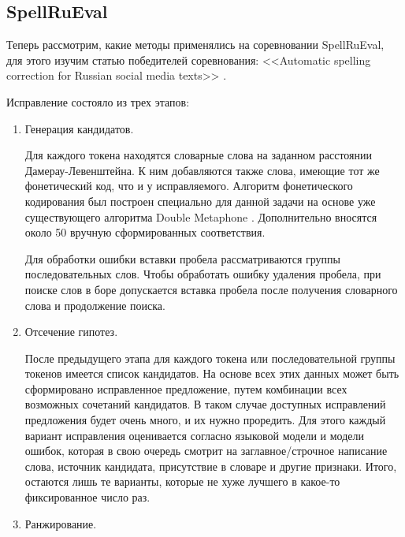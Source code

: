 \subsection{SpellRuEval}

Теперь рассмотрим, какие методы применялись на соревновании SpellRuEval, для этого изучим статью победителей соревнования: <<Automatic spelling correction for Russian social media texts>> \cite{Sorokin2016}.

Исправление состояло из трех этапов:
\begin{enumerate}
	\item Генерация кандидатов.
	
	Для каждого токена находятся словарные слова на заданном расстоянии Дамерау-Левенштейна. К ним добавляются также слова, имеющие тот же фонетический код, что и у исправляемого. Алгоритм фонетического кодирования был построен специально для данной задачи на основе уже существующего алгоритма Double Metaphone \cite{Philips2000}.  Дополнительно вносятся около 50 вручную сформированных соответствия. 
	
	Для обработки ошибки вставки пробела рассматриваются группы последовательных слов. Чтобы обработать ошибку удаления пробела, при поиске слов в боре допускается вставка пробела после получения словарного слова и продолжение поиска.
	\item Отсечение гипотез.
	
	После предыдущего этапа для каждого токена или последовательной группы токенов имеется список кандидатов. На основе всех этих данных может быть сформировано исправленное предложение, путем комбинации всех возможных сочетаний кандидатов. В таком случае доступных исправлений предложения будет очень много, и их нужно проредить. Для этого каждый вариант исправления оценивается согласно языковой модели и модели ошибок, которая в свою очередь смотрит на заглавное/строчное написание слова, источник кандидата, присутствие в словаре и другие признаки. Итого, остаются лишь те варианты, которые не хуже лучшего в какое-то фиксированное число раз.
	
	\item Ранжирование.
	

\end{enumerate}
